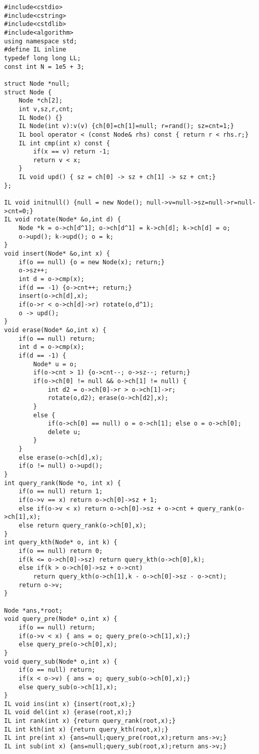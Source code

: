 \documentclass[UTF8]{ctexart}
\begin{document}
\begin{framed}
\begin{lstlisting}
#include<cstdio>
#include<cstring>
#include<cstdlib>
#include<algorithm>
using namespace std;
#define IL inline 
typedef long long LL;
const int N = 1e5 + 3;

struct Node *null;
struct Node {
    Node *ch[2];
    int v,sz,r,cnt;
    IL Node() {}
    IL Node(int v):v(v) {ch[0]=ch[1]=null; r=rand(); sz=cnt=1;}
    IL bool operator < (const Node& rhs) const { return r < rhs.r;}
    IL int cmp(int x) const {
        if(x == v) return -1;
        return v < x;
    }
    IL void upd() { sz = ch[0] -> sz + ch[1] -> sz + cnt;}
};

IL void initnull() {null = new Node(); null->v=null->sz=null->r=null->cnt=0;}
IL void rotate(Node* &o,int d) {
    Node *k = o->ch[d^1]; o->ch[d^1] = k->ch[d]; k->ch[d] = o;
    o->upd(); k->upd(); o = k;
}
void insert(Node* &o,int x) {
    if(o == null) {o = new Node(x); return;}
    o->sz++;
    int d = o->cmp(x);
    if(d == -1) {o->cnt++; return;}
    insert(o->ch[d],x);
    if(o->r < o->ch[d]->r) rotate(o,d^1);
    o -> upd();
}
void erase(Node* &o,int x) {
    if(o == null) return;
    int d = o->cmp(x);
    if(d == -1) {
        Node* u = o;
        if(o->cnt > 1) {o->cnt--; o->sz--; return;}
        if(o->ch[0] != null && o->ch[1] != null) {
            int d2 = o->ch[0]->r > o->ch[1]->r;
            rotate(o,d2); erase(o->ch[d2],x);
        }
        else {
            if(o->ch[0] == null) o = o->ch[1]; else o = o->ch[0];
            delete u;
        }
    }
    else erase(o->ch[d],x);
    if(o != null) o->upd();
}
int query_rank(Node *o, int x) {
    if(o == null) return 1;
    if(o->v == x) return o->ch[0]->sz + 1;
    else if(o->v < x) return o->ch[0]->sz + o->cnt + query_rank(o->ch[1],x);
    else return query_rank(o->ch[0],x);
}
int query_kth(Node* o, int k) {
    if(o == null) return 0;
    if(k <= o->ch[0]->sz) return query_kth(o->ch[0],k);
    else if(k > o->ch[0]->sz + o->cnt)
        return query_kth(o->ch[1],k - o->ch[0]->sz - o->cnt);
    return o->v;
}

Node *ans,*root;
void query_pre(Node* o,int x) {
    if(o == null) return;
    if(o->v < x) { ans = o; query_pre(o->ch[1],x);}
    else query_pre(o->ch[0],x);
}
void query_sub(Node* o,int x) {
    if(o == null) return;
    if(x < o->v) { ans = o; query_sub(o->ch[0],x);}
    else query_sub(o->ch[1],x);
}
IL void ins(int x) {insert(root,x);}
IL void del(int x) {erase(root,x);}
IL int rank(int x) {return query_rank(root,x);}
IL int kth(int x) {return query_kth(root,x);}
IL int pre(int x) {ans=null;query_pre(root,x);return ans->v;}
IL int sub(int x) {ans=null;query_sub(root,x);return ans->v;}


\end{lstlisting}
\end{framed}
\end{document}
